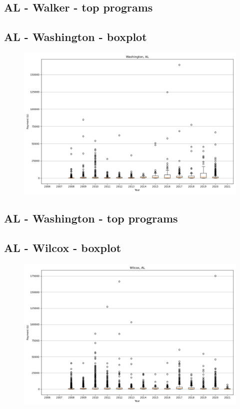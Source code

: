 \subsection*{AL - Walker - top programs}

\newpage
\subsection*{AL - Washington - boxplot}
\begin{figure}[h]
\centering
\includegraphics[width=7in]{../output/boxplots/counties/Washington-AL_boxplot.png}
\end{figure}


\subsection*{AL - Washington - top programs}

\newpage
\subsection*{AL - Wilcox - boxplot}
\begin{figure}[h]
\centering
\includegraphics[width=7in]{../output/boxplots/counties/Wilcox-AL_boxplot.png}
\end{figure}



